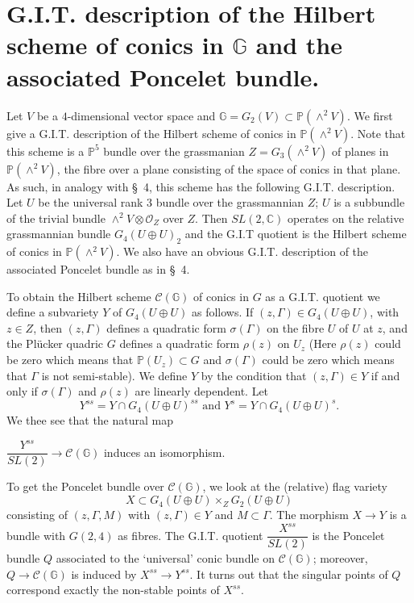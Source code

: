 \section[G.I.T. description of the Hilbert scheme...]{G.I.T. description of the Hilbert scheme of conics in
  \texorpdfstring{$\mathbb{G}$}{eq} and the associated Poncelet bundle.}

Let $V$ be a $4$-dimensional vector space and
$\mathbb{G}=G_2(V)\subset
\mathbb{P}\left(\displaystyle\mathop{\wedge}^{2} V\right)$. We first
give a G.I.T. description of the Hilbert scheme of conics in
$\mathbb{P}\left(\displaystyle\mathop{\wedge}^{2}V\right)$. Note that
this scheme is a $\mathbb{P}^{5}$ bundle over the grassmanian $Z=G_3
\left(\displaystyle\mathop{\wedge}^{2}V\right)$ of planes in
$\mathbb{P}\left(\displaystyle\mathop{\wedge}^{2}V\right)$, the fibre
over a plane consisting of the space of conics in that plane. As such,
in analogy with \S\ 4, this scheme has the following
G.I.T. description. Let $U$ be the universal rank $3$ bundle over the
grassmannian $Z$; $U$ is a subbundle of the trivial bundle
$\displaystyle\mathop{\wedge}^{2}V\otimes \mathscr{O}_Z$ over
$Z$. Then $SL(2,\mathbb{C})$ operates on the relative grassmannian
bundle $G_4(U\oplus U)_2$ and the G.I.T quotient is the Hilbert scheme
of conics in
$\mathbb{P}\left(\displaystyle\mathop{\wedge}^{2}V\right)$. We also
have an obvious G.I.T. description of the associated Poncelet bundle
as in \S\ 4. 

To obtain the Hilbert scheme $\mathscr{C}(\mathbb{G})$ of conics in
$G$ as a G.I.T. quotient we define a subvariety $Y$ of $G_4(U\oplus
U)$ as follows. If $(z,\Gamma)\in G_4(U\oplus U)$, with $z\in Z$,
then $(z,\Gamma)$ defines\pageoriginale
 a quadratic form $\sigma(\Gamma)$ on the
fibre $U$ of $U$ at $z$, and the Pl\"{u}cker quadric $G$ defines a
quadratic form $\rho(z)$ on $U_z$ (Here
$\rho(z)$ could be zero which means that $\mathbb{P}(U_z)\subset G$
and $\sigma (\Gamma)$ could be zero which means that $\Gamma$ is not
semi-stable). We define $Y$ by the condition that $(z,\Gamma)\in Y$ if
and only if $\sigma(\Gamma)$ and $\rho(z)$ are linearly dependent. Let 
$$
Y^{ss}=Y\cap G_4 (U\oplus U)^{ss}\text{ and } Y^{s}=Y\cap G_4(U\oplus U)^{s}.
$$
We thee see that the natural map 

$\dfrac{Y^{ss}}{SL(2)}\to \mathscr{C}(\mathbb{G})$ induces an
isomorphism. 

To get the Poncelet bundle over $\mathscr{C}(\mathbb{G})$, we look at
the (relative) flag variety
$$
X\subset G_4(U\oplus U)\times _Z G_2(U\oplus U)
$$
consisting of $(z,\Gamma, M)$ with $(z,\Gamma)\in Y$ and $M\subset
\Gamma$. The morphism $X\to Y$ is a bundle with $G(2,4)$ as
fibres. The G.I.T. quotient $\dfrac{X^{ss}}{SL(2)}$ is the Poncelet
bundle $Q$ associated to the `universal' conic bundle on
$\mathscr{C}(\mathbb{G})$; moreover, $Q\to \mathscr{C}(\mathbb{G})$ is
induced by $X^{ss}\to Y^{ss}$. It turns out that the singular points
of $Q$ correspond exactly the non-stable points of $X^{ss}$. 

